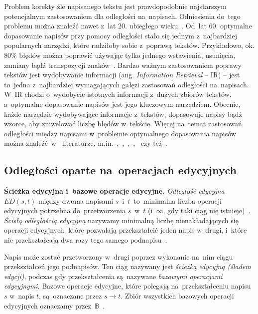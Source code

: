 \documentclass{praca1}
\begin{document}
Problem korekty źle napisanego tekstu jest prawdopodobnie najstarszym potencjalnym zastosowaniem dla odległości na~napisach. Odniesienia do~tego problemu można znaleźć nawet z~lat $20.$ ubiegłego wieku~\cite{Masters1927:spelling}. Od~lat $60.$ optymalne dopasowanie napisów przy pomocy odległości stało się jednym z~najbardziej popularnych narzędzi, które radziłoby sobie z~poprawą tekstów. Przykładowo, ok. $80\%$ błędów można poprawić używając tylko jednego wstawienia, usunięcia, zamiany bądź transpozycji znaków~\cite{Damerau1964:technique}. Bardzo ważnym zastosowaniem poprawy tekstów jest wydobywanie informacji (ang. \emph{Information Retrieval} -- IR) -- jest to~jedna z~najbardziej wymagających gałęzi zastosowań odległości na~napisach. W~IR chodzi o~wydobycie istotnych informacji z~dużych zbiorów tekstów, a~optymalne dopasowanie napisów jest jego kluczowym narzędziem. Obecnie, każde narzędzie wydobywające informacje z~tekstów, dopasowuje napisy bądź wzorce, aby zniwelować liczbę błędów w~tekście. Więcej na~temat zastosowań odległości między napisami w~problemie optymalnego dopasowania napisów można znaleźć~w~ literaturze, m.in.~\cite{Boytsov2011:indexingmethods},~\cite{Navarro2001:guidedtour},~\cite{Wagner1974:stringtostring},~\cite{Wagner1975:extensionstring},~\cite{Owolabi1988:fast} czy też~\cite{Kukich1992:correcting}.

\subsection{Odległości oparte na~operacjach edycyjnych}

\textbf{Ścieżka edycyjna i~bazowe operacje edycyjne.} \emph{Odległość edycyjna} $ED(s,t)$ między dwoma napisami $s$~i~$t$~to~minimalna liczba operacji edycyjnych potrzebna do~przetworzenia $s$~w~$t$ (i~$\infty$, gdy taki ciąg nie istnieje)~\cite{Navarro2001:guidedtour}. \emph{Ścisłą odległością edycyjną} nazywamy minimalną liczbę nienakładających się operacji edycyjnych, które pozwalają przekształcić jeden napis w~drugi, i~które nie przekształcają dwa razy tego samego podnapisu~\cite{Boytsov2011:indexingmethods}.

Napis może zostać przetworzony w~drugi poprzez wykonanie na~nim ciągu przekształceń jego podnapisów. Ten ciąg nazywany jest \emph{ścieżką edycyjną (śladem edycji)}, podczas gdy przekształcenia są~nazywane \emph{bazowymi operacjami edycyjnymi}. Bazowe operacje edycyjne, które polegają na~przekształceniu napisu $s$ w~napis $t$, są~oznaczane przez $s \rightarrow t$. Zbiór wszystkich bazowych operacji edycyjnych oznaczamy przez~$\mathbb{B}$~\cite{Boytsov2011:indexingmethods}. 
\end{document}

